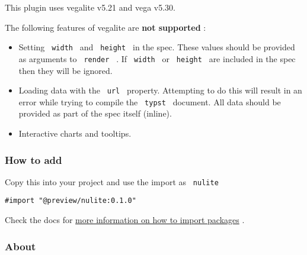 This plugin uses vegalite v5.21 and vega v5.30.

The following features of vegalite are \textbf{not supported} :

\begin{itemize}
\tightlist
\item
  Setting \texttt{\ width\ } and \texttt{\ height\ } in the spec. These
  values should be provided as arguments to \texttt{\ render\ } . If
  \texttt{\ width\ } or \texttt{\ height\ } are included in the spec
  then they will be ignored.
\item
  Loading data with the \texttt{\ url\ } property. Attempting to do this
  will result in an error while trying to compile the \texttt{\ typst\ }
  document. All data should be provided as part of the spec itself
  (inline).
\item
  Interactive charts and tooltips.
\end{itemize}

\subsubsection{How to add}\label{how-to-add}

Copy this into your project and use the import as \texttt{\ nulite\ }

\begin{verbatim}
#import "@preview/nulite:0.1.0"
\end{verbatim}



Check the docs for
\href{https://typst.app/docs/reference/scripting/\#packages}{more
information on how to import packages} .

\subsubsection{About}\label{about}

